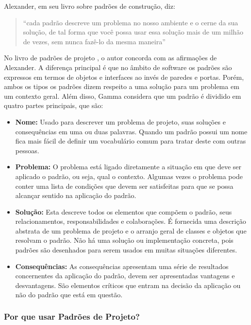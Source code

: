 Alexander, em seu livro \cite{Alexander:1979} sobre padrões de construção, diz:

\begin{quote}
	``cada padrão descreve um problema no nosso
ambiente e o cerne da sua solução, de tal forma que você possa usar essa solução mais
de um milhão de vezes, sem nunca fazê-lo da mesma maneira''
\end{quote}

No livro de padrões de projeto \cite{Gamma:Helm:Johnson:Vlissides:1995}, o autor concorda com as afirmações de Alexander. A diferença principal é que no âmbito de software os padrões são expressos em termos de objetos e interfaces ao invés de paredes e portas. Porém, ambos os tipos os padrões dizem respeito a uma solução para um problema em um contexto geral. Além disso, Gamma considera que um padrão é dividido em quatro partes principais, que são:

\begin{itemize}
	\item \textbf{Nome:} Usado para descrever um problema de projeto, suas soluções e consequências em uma ou duas palavras. Quando um padrão possui um nome fica mais fácil de definir um vocabulário comum para tratar deste com outras pessoas.
	\item \textbf{Problema:} O problema está ligado diretamente a situação em que deve ser aplicado o padrão, ou seja, qual o contexto. Algumas vezes o problema pode conter uma lista de condições que devem ser satisfeitas para que se possa alcançar sentido na aplicação do padrão.
	\item \textbf{Solução:} Esta descreve todos os elementos que compõem o padrão, seus relacionamentos, responsabilidades e colaborações. É fornecida uma descrição abstrata de um problema de projeto e o arranjo geral de classes e objetos que resolvam o padrão. Não há uma solução ou implementação concreta, pois padrões são desenhados para serem usados em muitas situações diferentes.
	\item \textbf{Consequências:} As consequências apresentam uma série de resultados concernentes da aplicação do padrão, devem ser apresentadas vantagens e desvantagens. São elementos críticos que entram na decisão da aplicação ou não do padrão que está em questão.
\end{itemize}

\subsubsection{Por que usar Padrões de Projeto?}

